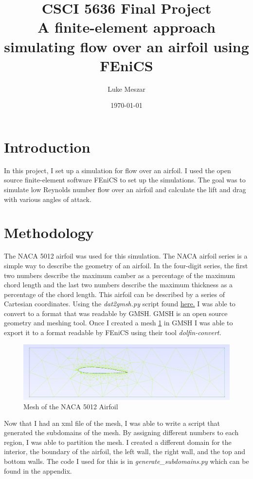 \documentclass[12pt]{article}
\title{CSCI 5636 Final Project\\
\large A finite-element approach simulating flow over an airfoil using FEniCS}
\author{Luke Meszar}
\date{\today}
\theoremstyle{definition}
\numberwithin{equation}{section}
\begin{document}
	\maketitle
	\section*{Introduction}
	In this project, I set up a simulation for flow over an airfoil. I used the open source finite-element software FEniCS \cite{AlnaesBlechta2015a} to set up the simulations. The goal was to simulate low Reynolds number flow over an airfoil and calculate the lift and drag with various angles of attack. 
	\section*{Methodology}
	\setcounter{section}{1}
	The NACA 5012 airfoil was used for this simulation. The NACA airfoil series  \cite{marzocca2009naca} is a simple way to describe the geometry of an airfoil. In the four-digit series, the first two numbers describe the maximum camber as a percentage of the maximum chord length and the last two numbers describe the maximum thickness as a percentage of the chord length. This airfoil can be described by a series of Cartesian coordinates. Using the \textit{dat2gmsh.py} script found \href{http://community.dur.ac.uk/g.l.ingram/download.php}{here.} I was able to convert to a format that was readable by GMSH. GMSH \cite{geuzaine2009gmsh} is an open source geometry and meshing tool. Once I created a mesh \cref{fig:mesh} in GMSH I was able to export it to a format readable by FEniCS using their tool \textit{dolfin-convert.}
	\begin{figure}[H]
		\centering
		\includegraphics[scale=0.2]{airfoil_mesh.png}
		\caption{Mesh of the NACA 5012 Airfoil}
		\label{fig:mesh}
	\end{figure}

	Now that I had an xml file of the mesh, I was able to write a script that generated the subdomains of the mesh. By assigning different numbers to each region, I was able to partition the mesh. I created a different domain for the interior, the boundary of the airfoil, the left wall, the right wall, and the top and bottom walls. The code I used for this is in \textit{generate\_subdomains.py} which can be found in the appendix. 
	
\end{document}
